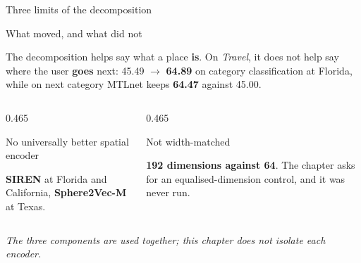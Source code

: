 \documentclass{beamer}
\begin{document}
\begin{frame}{Three limits of the decomposition}
    \begin{block}{What moved, and what did not}
        {\small
        The decomposition helps say what a place \textbf{is}. On \textit{Travel}, it does not help
        say where the user \textbf{goes} next: 45.49 $\rightarrow$
        \textcolor{primaryshade}{\textbf{64.89}} on category classification at Florida, while on
        next category MTLnet keeps \textbf{64.47} against 45.00.\par}
    \end{block}

    \medskip
    \begin{columns}[t,onlytextwidth]
        \begin{column}{0.465\textwidth}
            \begin{block}{No universally better spatial encoder}
                {\small \textbf{SIREN} at Florida and California, \textbf{Sphere2Vec-M} at Texas.\par}
            \end{block}
        \end{column}
        \hfill
        \begin{column}{0.465\textwidth}
            \begin{alertblock}{Not width-matched}
                {\small \textbf{192 dimensions against 64}. The chapter asks for an equalised-dimension control, and \alert{it was never run}.\par}
            \end{alertblock}
        \end{column}
    \end{columns}

    \vfill
    {\footnotesize\itshape The three components are used together; this chapter does not isolate
    each encoder.\par}
\end{frame}
\end{document}
